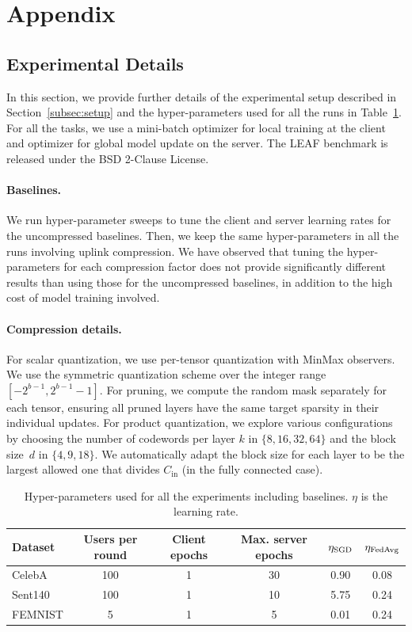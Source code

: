 \clearpage
\section{Appendix}

\subsection{Experimental Details}
\label{appendix:exp_details}
In this section, we provide further details of the experimental setup described in Section~\ref{subsec:setup} and the hyper-parameters used for all the runs in Table~\ref{tab:hp}. For all the tasks, we use a mini-batch \SGD optimizer for local training at the client and \FedAvg optimizer for global model update on the server. The LEAF benchmark is released under the BSD 2-Clause License.

\paragraph{Baselines.} We run hyper-parameter sweeps to tune the client and server learning rates for the uncompressed baselines. Then, we keep the same hyper-parameters in all the runs involving uplink compression. We have observed that tuning the hyper-parameters for each compression factor does not provide significantly different results than using those for the uncompressed baselines, in addition to the high cost of model training involved.

\paragraph{Compression details.}For scalar quantization, we use per-tensor quantization with MinMax observers. We use the symmetric quantization scheme over the integer range $[-2^{b-1}, 2^{b-1} - 1]$. For pruning, we compute the random mask separately for each tensor, ensuring all pruned layers have the same target sparsity in their individual updates. For product quantization, we explore various configurations by choosing the number of codewords per layer $k$ in $\{8, 16, 32, 64\}$ and the block size~$d$ in $\{4, 9, 18\}$. We automatically adapt the block size for each layer to be the largest allowed one that divides $C_{\text{in}}$ (in the fully connected case).

\begin{table}[!ht]
 \caption{Hyper-parameters used for all the experiments including baselines. $\eta$ is the learning rate.}
    \centering
    \begin{tabular}{l|ccccc}
    \toprule
    Dataset & Users per round & Client epochs & Max. server epochs & $\eta_\mathrm{{\sc SGD}}$ & $\eta_\mathrm{{\sc FedAvg}}$ \\
    \midrule
    CelebA & 100 & 1 & 30 & 0.90 & 0.08 \\
    Sent140 & 100 & 1 & 10 & 5.75 & 0.24 \\
    FEMNIST & 5 & 1 & 5 & 0.01 & 0.24 \\
    \bottomrule
    \end{tabular}
    \label{tab:hp}
\end{table}


